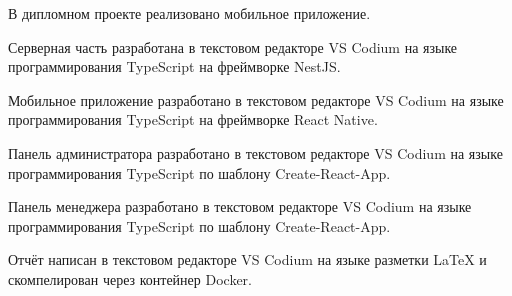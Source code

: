 
В дипломном проекте реализовано мобильное приложение.

Серверная часть разработана в текстовом редакторе VS Codium
на языке программирования TypeScript на фреймворке NestJS.

Мобильное приложение разработано в текстовом редакторе VS Codium
на языке программирования TypeScript на фреймворке React Native.

Панель администратора разработано в текстовом редакторе VS Codium
на языке программирования TypeScript по шаблону Create-React-App.

Панель менеджера разработано в текстовом редакторе VS Codium
на языке программирования TypeScript по шаблону Create-React-App.

Отчёт написан в текстовом редакторе VS Codium на языке разметки LaTeX
и скомпелирован через контейнер Docker.
